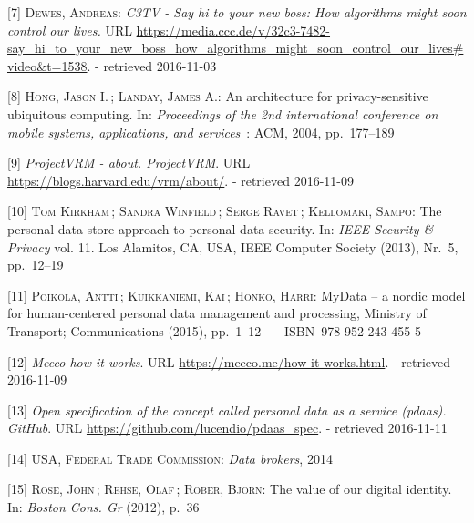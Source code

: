 \documentclass[12pt,english,a4paper,titlepage,cleardoublepage=empty,dottedtoc]{report}
\begin{document}
\hypertarget{ref-video_2015_big-data-and-deep-learning_discrimination}{}
{[}7{]} \textsc{Dewes, Andreas}: \emph{C3TV - Say hi to your new boss:
How algorithms might soon control our lives.} URL
\url{https://media.ccc.de/v/32c3-7482-say_hi_to_your_new_boss_how_algorithms_might_soon_control_our_lives\#video\&t=1538}.
- retrieved 2016-11-03

\hypertarget{ref-study_2004_architecture-for-privacy-sensitive-ubiquitous-computing}{}
{[}8{]} \textsc{Hong, Jason I.}\,; \textsc{Landay, James A.}: An
architecture for privacy-sensitive ubiquitous computing. In:
\emph{Proceedings of the 2nd international conference on mobile systems,
applications, and services}~: ACM, 2004, pp.~177--189

\hypertarget{ref-web_2010_projectvrm_about}{}
{[}9{]} \emph{ProjectVRM - about. ProjectVRM}. URL
\url{https://blogs.harvard.edu/vrm/about/}. - retrieved 2016-11-09

\hypertarget{ref-paper_2013_the-personal-data-store-approach-to-personal-data-security_2013}{}
{[}10{]} \textsc{Tom Kirkham}\,; \textsc{Sandra Winfield}\,;
\textsc{Serge Ravet}\,; \textsc{Kellomaki, Sampo}: The personal data
store approach to personal data security. In: \emph{IEEE Security \&
Privacy} vol. 11. Los Alamitos, CA, USA, IEEE Computer Society (2013),
Nr.~5, pp.~12--19

\hypertarget{ref-whitepaper_2014_mydata-a-nordic-model-for-human-centered-personal-data-management-and-processing}{}
{[}11{]} \textsc{Poikola, Antti}\,; \textsc{Kuikkaniemi, Kai}\,;
\textsc{Honko, Harri}: MyData -- a nordic model for human-centered
personal data management and processing, Ministry of Transport;
Communications (2015), pp.~1--12 ---~ISBN~978-952-243-455-5

\hypertarget{ref-web_2016_meeco-how-it-works}{}
{[}12{]} \emph{Meeco how it works}. URL
\url{https://meeco.me/how-it-works.html}. - retrieved 2016-11-09

\hypertarget{ref-repo_2016_pdaas-spec}{}
{[}13{]} \emph{Open specification of the concept called personal data as
a service (pdaas). GitHub}. URL
\url{https://github.com/lucendio/pdaas_spec}. - retrieved 2016-11-11

\hypertarget{ref-report_2014_data-brokers}{}
{[}14{]} \textsc{USA, Federal Trade Commission}: \emph{Data brokers},
2014

\hypertarget{ref-whitepaper_2012_the-value-of-our-digital-identity_definition}{}
{[}15{]} \textsc{Rose, John}\,; \textsc{Rehse, Olaf}\,; \textsc{Röber,
Björn}: The value of our digital identity. In: \emph{Boston Cons. Gr}
(2012), p.~36
\end{document}
